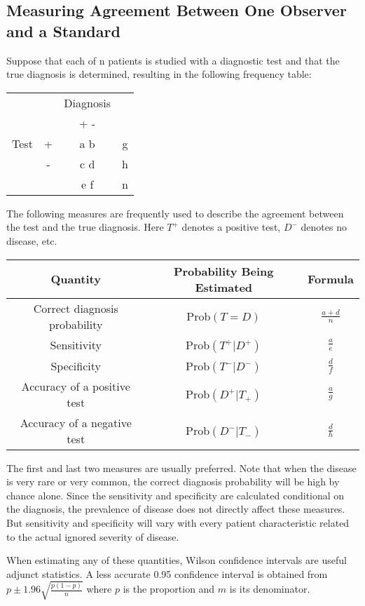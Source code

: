 \subsection{Measuring Agreement Between One Observer and a Standard}
Suppose that each of n patients is studied with a diagnostic test and
that the true diagnosis is determined, resulting in the following frequency
table:
\begin{center}\begin{tabular}{cccc}
& & Diagnosis & \\
          &   & + - &  \\
Test      & + & a b & g\\
          & - & c d & h\\
          &   & e f & n\\
\end{tabular}\end{center}
The following measures are frequently used to describe the agreement between
the test and the true diagnosis.  Here $T^{+}$ denotes a positive test, $D^{-}$ 
denotes  no disease, etc.
\begin{center}\begin{tabular}{ccc}
Quantity & Probability Being Estimated & Formula \\ \hline
Correct diagnosis probability & Prob$(T = D)$ &  $\frac{a+d}{n}$ \\
Sensitivity & Prob$(T^{+} | D^{+})$ & $\frac{a}{e}$ \\
Specificity & Prob$(T^{-} | D^{-})$ & $\frac{d}{f}$ \\
Accuracy of a positive test & Prob$(D^{+} | T_{+})$ & $\frac{a}{g}$ \\
Accuracy of a negative test & Prob$(D^{-} | T_{-})$ & $\frac{d}{h}$
\end{tabular}\end{center}
The first and last two measures are usually preferred.
Note that when the disease is very rare or very common, the correct
diagnosis probability will be high by chance alone. Since the sensitivity and
specificity are calculated conditional on the diagnosis, the prevalence of
disease does not directly affect these measures.  But sensitivity and 
specificity will vary with every patient characteristic related to the actual 
ignored severity of disease.  

When estimating any of these quantities, Wilson confidence intervals are useful
adjunct statistics.  A less accurate 0.95 confidence interval is obtained
from $p \pm 1.96\sqrt{\frac{p(1-p)}{n}}$ where $p$ is the proportion
and $m$ is its denominator.


